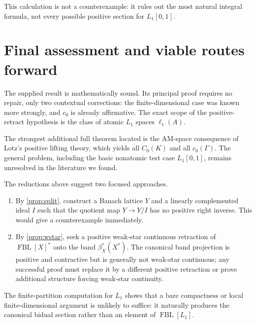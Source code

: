 \documentclass[11pt]{article}
\newcommand{\FBL}{\operatorname{FBL}}
\begin{document}
This calculation is not a counterexample: it rules out the most natural
integral formula, not every possible positive section for $L_1[0,1]$.

\section{Final assessment and viable routes forward}

The supplied result is mathematically sound.  Its principal proof requires no
repair, only two contextual corrections: the finite-dimensional case was
known more strongly, and $c_0$ is already affirmative.  The exact scope of the
positive-retract hypothesis is the class of atomic $L_1$ spaces
$\ell_1(A)$.

The strongest additional full theorem located is the AM-space consequence of
Lotz's positive lifting theory, which yields all $C_0(K)$ and all
$c_0(\Gamma)$.  The general problem, including the basic nonatomic test case
$L_1[0,1]$, remains unresolved in the literature we found.

The reductions above suggest two focused approaches.
\begin{enumerate}[label=(\arabic*),leftmargin=2.2em]
\item By \cref{prop:split}, construct a Banach lattice $Y$ and a linearly
complemented ideal $I$ such that the quotient map $Y\to Y/I$ has no positive
right inverse.  This would give a counterexample immediately.
\item By \cref{prop:wstar}, seek a positive weak-star continuous retraction of
$\FBL[X]^*$ onto the band $\beta_X^*(X^*)$.  The canonical band projection is
positive and contractive but is generally not weak-star continuous; any
successful proof must replace it by a different positive retraction or prove
additional structure forcing weak-star continuity.
\end{enumerate}

The finite-partition computation for $L_1$ shows that a bare compactness or
local finite-dimensional argument is unlikely to suffice: it naturally
produces the canonical bidual section rather than an element of
$\FBL[L_1]$.
\end{document}
